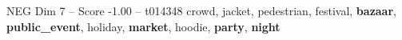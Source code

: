 \begin{textsample}{NEG Dim 7 – Score -1.00 – t014348}  \label{ex:f7_neg_016}
crowd, jacket, pedestrian, festival, \textbf{bazaar}, \textbf{public\_event}, holiday, \textbf{market}, hoodie, \textbf{party}, \textbf{night}

\end{textsample}
